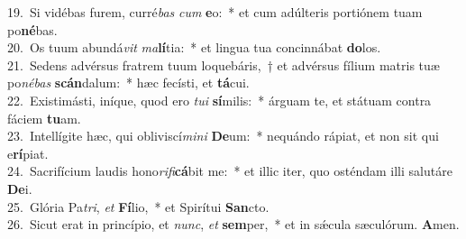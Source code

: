 {19.~}Si vidébas furem, curré\textit{bas} \textit{cum} \textbf{e}o:~* et cum adúlteris portiónem tuam po\textbf{né}bas.\\
{20.~}Os tuum abundá\textit{vit} \textit{ma}\textbf{lí}tia:~* et lingua tua concinnábat \textbf{do}los.\\
{21.~}Sedens advérsus fratrem tuum loquebáris,~† et advérsus fílium matris tuæ po\textit{né}\textit{bas} \textbf{scán}dalum:~* hæc fecísti, et \textbf{tá}cui.\\
{22.~}Existimásti, iníque, quod ero \textit{tu}\textit{i} \textbf{sí}milis:~* árguam te, et státuam contra fáciem \textbf{tu}am.\\
{23.~}Intellígite hæc, qui obliviscí\textit{mi}\textit{ni} \textbf{De}um:~* nequándo rápiat, et non sit qui e\textbf{rí}piat.\\
{24.~}Sacrifícium laudis hono\textit{ri}\textit{fi}\textbf{cá}bit me:~* et illic iter, quo osténdam illi salutáre \textbf{De}i.\\
{25.~}Glória Pa\textit{tri}, \textit{et} \textbf{Fí}lio,~* et Spirítui \textbf{San}cto.\\
{26.~}Sicut erat in princípio, et \textit{nunc}, \textit{et} \textbf{sem}per,~* et in sǽcula sæculórum. \textbf{A}men.\\
